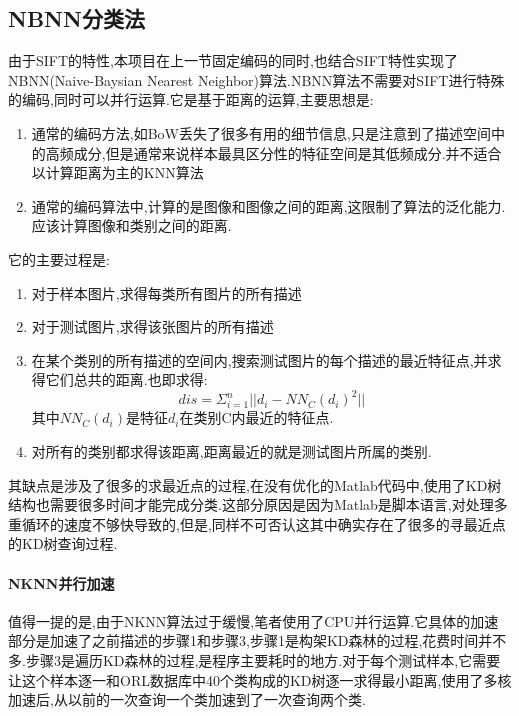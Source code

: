\subsection{NBNN分类法}
由于SIFT的特性,本项目在上一节固定编码的同时,也结合SIFT特性实现了NBNN(Naive-Baysian Nearest Neighbor)算法\cite{boiman2008defense}.NBNN算法不需要对SIFT进行特殊的编码,同时可以并行运算.它是基于距离的运算,主要思想是:
	\begin{enumerate}
		\item 通常的编码方法,如BoW丢失了很多有用的细节信息,只是注意到了描述空间中的高频成分,但是通常来说样本最具区分性的特征空间是其低频成分.并不适合以计算距离为主的KNN算法
		\item 通常的编码算法中,计算的是图像和图像之间的距离,这限制了算法的泛化能力.应该计算图像和类别之间的距离.
	\end{enumerate}
	它的主要过程是:
	\begin{enumerate}
		\item 对于样本图片,求得每类所有图片的所有描述
		\item 对于测试图片,求得该张图片的所有描述
		\item 在某个类别的所有描述的空间内,搜索测试图片的每个描述的最近特征点,并求得它们总共的距离.也即求得:
			\begin{equation}
				dis = \Sigma_{i=1}^n  || d_i - NN_C(d_i)^2||
			\end{equation}
			其中$NN_C(d_i)$是特征$d_i$在类别C内最近的特征点.
			
		\item 对所有的类别都求得该距离,距离最近的就是测试图片所属的类别.
	\end{enumerate}

其缺点是涉及了很多的求最近点的过程,在没有优化的Matlab代码中,使用了KD树结构也需要很多时间才能完成分类.这部分原因是因为Matlab是脚本语言,对处理多重循环的速度不够快导致的,但是,同样不可否认这其中确实存在了很多的寻最近点的KD树查询过程.

\paragraph{NKNN并行加速}
值得一提的是,由于NKNN算法过于缓慢,笔者使用了CPU并行运算.它具体的加速部分是加速了之前描述的步骤1和步骤3,步骤1是构架KD森林的过程,花费时间并不多.步骤3是遍历KD森林的过程,是程序主要耗时的地方.对于每个测试样本,它需要让这个样本逐一和ORL数据库中40个类构成的KD树逐一求得最小距离,使用了多核加速后,从以前的一次查询一个类加速到了一次查询两个类.\newline


